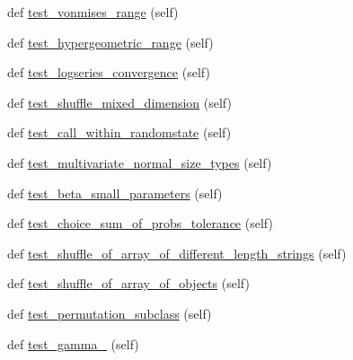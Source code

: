\begin{DoxyCompactItemize}
\item 
def \hyperlink{classnumpy_1_1random_1_1tests_1_1test__generator__mt19937__regressions_1_1TestRegression_af0d2020dba880671e355b482af68eaca}{test\+\_\+vonmises\+\_\+range} (self)
\item 
def \hyperlink{classnumpy_1_1random_1_1tests_1_1test__generator__mt19937__regressions_1_1TestRegression_ac1e14451e1070f6dc5d28515eb4c8996}{test\+\_\+hypergeometric\+\_\+range} (self)
\item 
def \hyperlink{classnumpy_1_1random_1_1tests_1_1test__generator__mt19937__regressions_1_1TestRegression_ad0f0681f19f3982b8c1b0c219d349675}{test\+\_\+logseries\+\_\+convergence} (self)
\item 
def \hyperlink{classnumpy_1_1random_1_1tests_1_1test__generator__mt19937__regressions_1_1TestRegression_af03893eddcb6efc70f1d2d2c0353259f}{test\+\_\+shuffle\+\_\+mixed\+\_\+dimension} (self)
\item 
def \hyperlink{classnumpy_1_1random_1_1tests_1_1test__generator__mt19937__regressions_1_1TestRegression_a2a1fde4bfbee9c9c3a4ffe07a7ed7a0b}{test\+\_\+call\+\_\+within\+\_\+randomstate} (self)
\item 
def \hyperlink{classnumpy_1_1random_1_1tests_1_1test__generator__mt19937__regressions_1_1TestRegression_ac1b98baef2117e1e1ef3e94e2b373b7c}{test\+\_\+multivariate\+\_\+normal\+\_\+size\+\_\+types} (self)
\item 
def \hyperlink{classnumpy_1_1random_1_1tests_1_1test__generator__mt19937__regressions_1_1TestRegression_af6e4ef72116aec98170f5a1ad002697b}{test\+\_\+beta\+\_\+small\+\_\+parameters} (self)
\item 
def \hyperlink{classnumpy_1_1random_1_1tests_1_1test__generator__mt19937__regressions_1_1TestRegression_add5521abbd550af615c2a4c884fe6f73}{test\+\_\+choice\+\_\+sum\+\_\+of\+\_\+probs\+\_\+tolerance} (self)
\item 
def \hyperlink{classnumpy_1_1random_1_1tests_1_1test__generator__mt19937__regressions_1_1TestRegression_a89bb2bdb1e781bbc8241349a5c640199}{test\+\_\+shuffle\+\_\+of\+\_\+array\+\_\+of\+\_\+different\+\_\+length\+\_\+strings} (self)
\item 
def \hyperlink{classnumpy_1_1random_1_1tests_1_1test__generator__mt19937__regressions_1_1TestRegression_a464bbad6c2f7f9b85c1c2b296c4aeea1}{test\+\_\+shuffle\+\_\+of\+\_\+array\+\_\+of\+\_\+objects} (self)
\item 
def \hyperlink{classnumpy_1_1random_1_1tests_1_1test__generator__mt19937__regressions_1_1TestRegression_ad6b6175fe1e27cdb401d0c871849b3aa}{test\+\_\+permutation\+\_\+subclass} (self)
\item 
def \hyperlink{classnumpy_1_1random_1_1tests_1_1test__generator__mt19937__regressions_1_1TestRegression_a3c34c45b8731d1c949f706acc3bc063b}{test\+\_\+gamma\+\_} (self)
\end{DoxyCompactItemize}


